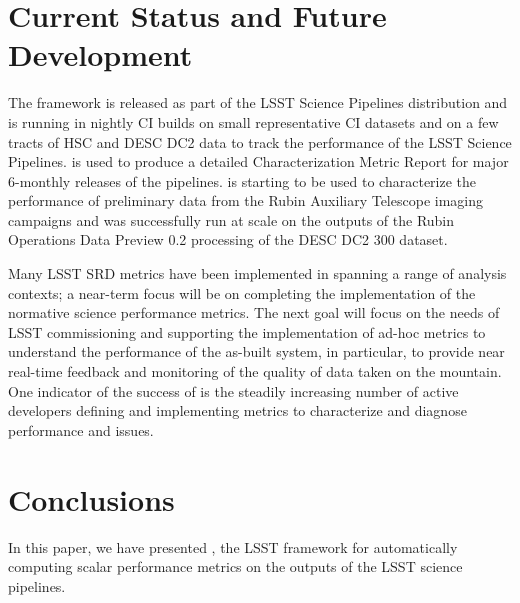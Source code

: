 \section{Current Status and Future Development} \label{sec:future}

The \faro framework is released as part of the LSST Science Pipelines distribution and is running in 
nightly CI builds on small representative CI datasets and on a few tracts of HSC and DESC DC2 data to track the performance of the LSST Science Pipelines.
\faro is used to produce a detailed Characterization Metric Report for major 6-monthly releases of the pipelines. 
\faro is starting to be used to characterize the performance of preliminary data from the Rubin Auxiliary Telescope imaging campaigns and was successfully run at scale on the outputs of the Rubin Operations Data Preview 0.2 processing of the DESC DC2 300 \degsq dataset.

Many LSST SRD metrics have been implemented in \faro spanning a range of analysis contexts; a near-term focus will be on completing the implementation of the normative science performance metrics.
The next goal will focus on the needs of LSST commissioning and supporting the implementation of ad-hoc metrics to understand the performance of the as-built system, in particular, to provide near real-time feedback and monitoring of the quality of data taken on the mountain.
One indicator of the success of \faro is the steadily increasing number of active developers defining and implementing metrics to characterize and diagnose performance and issues.

\section{Conclusions} \label{sec:conclusions}

In this paper, we have presented \faro, the LSST framework for automatically computing scalar performance metrics on the outputs of the LSST science pipelines.

